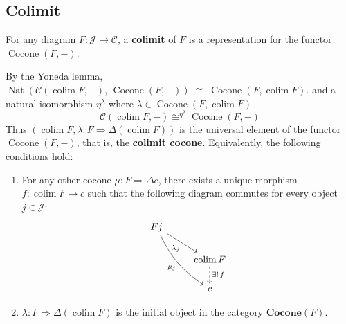 \documentclass[12pt, oneside]{book}
\begin{document}
\subsection{Colimit}
\begin{definition}
    For any diagram $F: \mathcal{J} \rightarrow \mathcal{C}$,
    a \textbf{colimit} of $F$ is a representation for the functor $\operatorname{Cocone}(F,-)$.
    \begin{remark}
        By the Yoneda lemma,
        $\operatorname{Nat}\!\left(\mathcal{C}(\operatorname{colim} F,-),\,\operatorname{Cocone}(F,-)\right)
            \;\cong\;
            \operatorname{Cocone}(F,\operatorname{colim} F).$
        and a natural isomorphism $\eta^\lambda $ where $\lambda \in \operatorname{Cocone}(F,\operatorname{colim} F)$
        \begin{equation*}
            \mathcal{C}(\operatorname{colim} F,-)
            \cong^{\eta^{\lambda}}
            \operatorname{Cocone}(F,-)
        \end{equation*}
        Thus $\left(\operatorname{colim} F,\lambda: F\Rightarrow \Delta(\operatorname{colim} F)\right)$ is the universal element of the functor $\operatorname{Cocone}(F,-)$,
        that is, the \textbf{colimit cocone}.
        Equivalently, the following conditions hold:
        \begin{enumerate}
            \item For any other cocone $\mu:F\Rightarrow \Delta c$, there exists a unique morphism $f:\operatorname{colim} F\to c$ such that the following diagram commutes for every object $j\in\mathcal{J}$:
                  \begin{equation*}
                      \begin{tikzcd}
                          Fj\arrow[rd,"\lambda_j"']\arrow[rdd,bend right=15,"\mu_j"']&\\
                          &\operatorname{colim} F\arrow[d,dashed,"\exists!\,f"]\\
                          &c
                      \end{tikzcd}
                  \end{equation*}
            \item
                  $\lambda: F \Rightarrow \Delta(\operatorname{colim} F)$ is the initial object in the category $\mathbf{Cocone}(F)$.
        \end{enumerate}
    \end{remark}
\end{definition}
\end{document}
